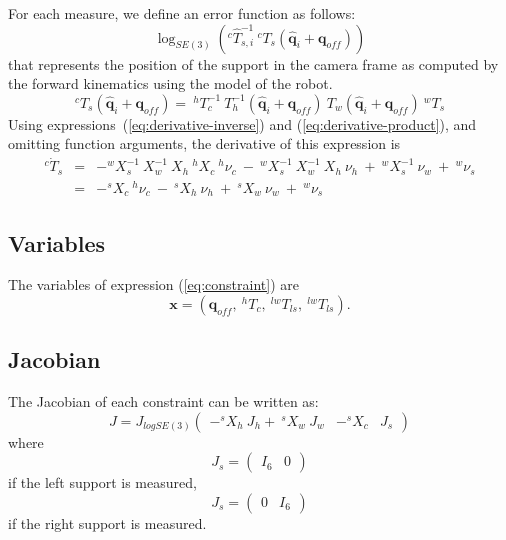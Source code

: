 \documentclass {article}
\newcommand\conf{\mathbf{q}}
\newcommand\confoffset{\mathbf{q}_{off}}
\newcommand\transf{T}
\newcommand\x{\mathbf{x}}
\begin{document}
For each measure, we define an error function as follows:
\begin{equation}\label{eq:constraint}
\log_{SE(3)}\left(^{c}\hat{\transf}_{s,i}^{-1}\ ^{c}{\transf}_{s} (\hat{\conf}_{i} + \confoffset)\right)
\end{equation}
that represents the position of the support in the camera frame as
computed by the forward kinematics using the model of the robot.
$$
^{c}{\transf}_{s} (\hat{\conf}_{i} + \confoffset) =\ ^{h}\transf_{c}^{-1}\ \transf_{h}^{-1}(\hat{\conf}_{i} + \confoffset)\ \transf_{w} (\hat{\conf}_{i} + \confoffset)\ ^{w}\transf_{s}
$$
Using expressions~(\ref{eq:derivative-inverse}) and (\ref{eq:derivative-product}), and omitting function arguments, the derivative of this expression is
\begin{eqnarray*}
^{c}{\dot{\transf}}_{s} &=& -^{w}X_{s}^{-1}\ X_{w}^{-1}\ X_{h}\ ^{h}X_{c}\ ^{h}\nu_{c}\ -\ 
^{w}X_{s}^{-1}\ X_{w}^{-1}\ X_{h}\ \nu_{h}\ +\ ^{w}X_{s}^{-1}\ \nu_{w}\ +\ ^{w}\nu_{s}\\
&=& -^{s}X_{c}\ ^{h}\nu_{c}\ -\ 
^{s}X_{h}\ \nu_{h}\ +\ ^{s}X_{w}\ \nu_{w}\ +\ ^{w}\nu_{s}\end{eqnarray*}

\subsection{Variables}

The variables of expression (\ref{eq:constraint}) are
$$
\x = \left(\confoffset,\ ^{h}\transf_{c},\ ^{lw}\transf_{ls},\ ^{lw}\transf_{ls}\right).
$$

\subsection{Jacobian}

The Jacobian of each constraint can be written as:
\begin{equation}\label{eq:error-jacobian}
J = J_{logSE(3)}
\left(\begin{array}{cccc}
  -^{s}X_{h}\ J_{h} %
  +\ ^{s}X_{w}\ J_{w}%
  & -^{s}X_{c}
  & J_{s}
\end{array}
\right)
\end{equation}
where
$$
J_{s} =
\left(\begin{array}{cc}
I_6 & 0
\end{array}\right)
$$
if the left support is measured,
$$
J_{s} =
\left(\begin{array}{cc}
  0 & I_6
\end{array}\right)
$$
if the right support is measured.
\end{document}
